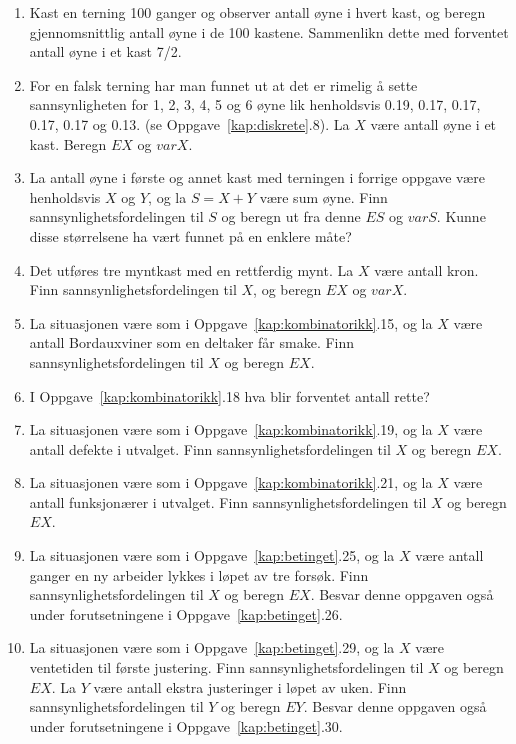 \begin{enumerate}
\item Kast en terning 100 ganger og observer antall øyne i hvert
     kast, og beregn gjennomsnittlig antall øyne i de 100
     kastene. Sammenlikn dette med forventet antall øyne i et
     kast 7/2.

\item For en falsk terning har man funnet ut at det er rimelig å
     sette sannsynligheten for 1, 2, 3, 4, 5 og 6 øyne lik
     henholdsvis 0.19, 0.17, 0.17, 0.17, 0.17 og 0.13. (se
	Oppgave~\ref*{kap:diskrete}.8). La $X$ være antall øyne i et kast. Beregn $EX$
     og $varX$.

\item La antall øyne i første og annet kast med terningen i
     forrige oppgave være henholdsvis $X$ og $Y$, og la $S=X+Y$
     være sum øyne. Finn sannsynlighetsfordelingen til $S$ og
     beregn ut fra denne $ES$ og $varS$. Kunne disse størrelsene
     ha vært funnet på en enklere måte?

\item Det utføres tre myntkast med en rettferdig mynt. La $X$ være
     antall kron. Finn sannsynlighetsfordelingen til $X$, og
     beregn $EX$ og $varX$.          

\item La situasjonen være som i Oppgave~\ref*{kap:kombinatorikk}.15, og la $X$ være
     antall Bordauxviner som en deltaker får smake. Finn
     sannsynlighetsfordelingen til $X$ og beregn $EX$.

\item I Oppgave~\ref*{kap:kombinatorikk}.18 hva blir forventet antall rette?

\item La situasjonen være som i Oppgave~\ref*{kap:kombinatorikk}.19, og la $X$ være
     antall defekte i utvalget. Finn sannsynlighetsfordelingen
     til $X$ og beregn $EX$.

\item La situasjonen være som i Oppgave~\ref*{kap:kombinatorikk}.21, og la $X$ være
     antall funksjonærer i utvalget. Finn
     sannsynlighetsfordelingen til $X$ og beregn $EX$.

\item La situasjonen være som i Oppgave~\ref*{kap:betinget}.25, og la $X$ være
     antall ganger en ny arbeider lykkes i løpet av tre forsøk.
     Finn sannsynlighetsfordelingen til $X$ og beregn $EX$.
     Besvar denne oppgaven også under forutsetningene i Oppgave~\ref*{kap:betinget}.26.

\item La situasjonen være som i Oppgave~\ref*{kap:betinget}.29, og la $X$ være
     ventetiden til første justering. Finn
     sannsynlighetsfordelingen til $X$ og beregn $EX$. La $Y$
     være antall ekstra justeringer i løpet av uken. Finn
     sannsynlighetsfordelingen til $Y$ og beregn $EY$. Besvar
     denne oppgaven også under forutsetningene i Oppgave~\ref*{kap:betinget}.30.


\end{enumerate}
